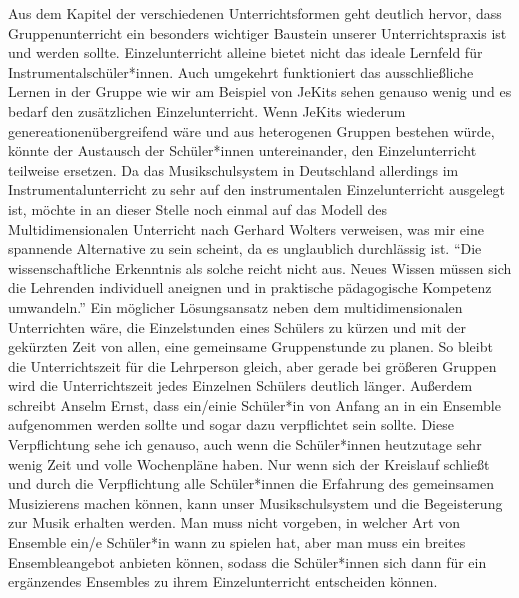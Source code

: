Aus dem Kapitel der verschiedenen Unterrichtsformen geht deutlich hervor, dass
Gruppenunterricht ein besonders wichtiger Baustein unserer Unterrichtspraxis ist
und werden sollte. Einzelunterricht alleine bietet nicht das ideale Lernfeld für
Instrumentalschüler*innen. Auch umgekehrt funktioniert das ausschließliche
Lernen in der Gruppe wie wir am Beispiel von JeKits sehen genauso wenig und es
bedarf den zusätzlichen Einzelunterricht. Wenn JeKits wiederum
genereationenübergreifend wäre und aus heterogenen Gruppen bestehen würde,
könnte der Austausch der Schüler*innen untereinander, den Einzelunterricht teilweise
ersetzen. 
Da das Musikschulsystem in Deutschland
allerdings im Instrumentalunterricht zu sehr auf den instrumentalen
Einzelunterricht ausgelegt ist, möchte in an dieser Stelle noch einmal auf das
Modell des Multidimensionalen Unterricht nach Gerhard Wolters verweisen, was mir
eine spannende Alternative zu sein scheint, da es unglaublich durchlässig ist.
\enquote{Die wissenschaftliche Erkenntnis als solche reicht nicht aus. Neues
Wissen müssen sich die Lehrenden individuell aneignen und in praktische
pädagogische Kompetenz umwandeln.}
\autocite[10]{losert:die_kunst_zu_unterrichten} Ein möglicher Lösungsansatz
neben dem multidimensionalen Unterrichten wäre, die Einzelstunden eines Schülers
zu kürzen und mit der gekürzten Zeit von allen, eine gemeinsame Gruppenstunde zu
planen. So bleibt die Unterrichtszeit für die Lehrperson gleich, aber gerade bei
größeren Gruppen wird die Unterrichtszeit jedes Einzelnen Schülers deutlich
länger.\autocite[33]{losert:die_kunst_zu_unterrichten} Außerdem schreibt Anselm
Ernst, dass ein/einie Schüler*in von Anfang an in ein Ensemble aufgenommen
werden sollte und sogar dazu verpflichtet sein sollte.
\autocite[61]{ernst:die_zukunftsfaehige_musikschule} Diese Verpflichtung sehe
ich genauso, auch wenn die Schüler*innen heutzutage sehr wenig Zeit und volle
Wochenpläne haben. Nur wenn sich der Kreislauf schließt und durch die
Verpflichtung alle Schüler*innen die Erfahrung des gemeinsamen Musizierens
machen können, kann unser Musikschulsystem und die Begeisterung zur Musik
erhalten werden. Man muss nicht vorgeben, in welcher Art von Ensemble ein/e
Schüler*in wann zu spielen hat, aber man muss ein breites Ensembleangebot
anbieten können, sodass die Schüler*innen sich dann für ein ergänzendes
Ensembles zu ihrem Einzelunterricht entscheiden können.

